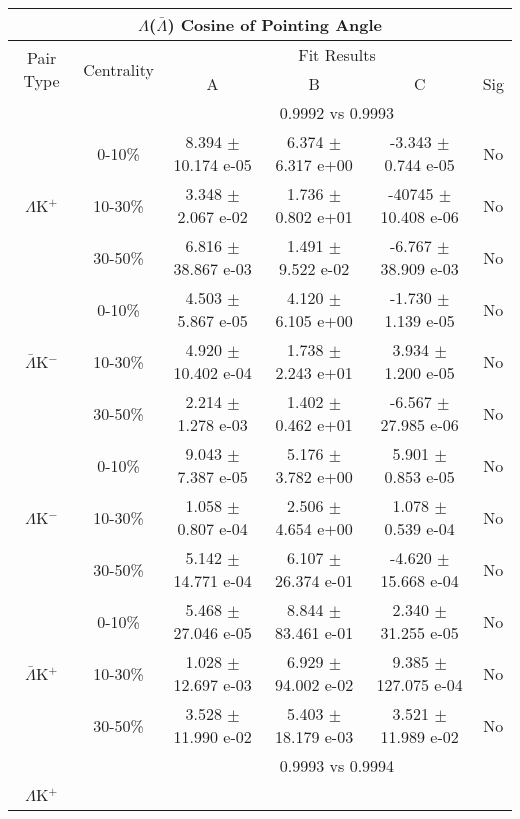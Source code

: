 \documentclass[../AnalysisNoteJBuxton.tex]{subfiles}
\begin{document}
\begin{table}
 \centering
 \begin{tabular}{|c|c|c|c|c|c|}
  \multicolumn{6}{c}{$\Lambda$($\bar{\Lambda}$) Cosine of Pointing Angle} \\
  \hline
  \multirow{2}{*}{Pair Type} & \multirow{2}{*}{Centrality} & \multicolumn{4}{c|}{Fit Results} \\
  \cline{3-6}
   & & A & B & C & Sig \\  
  \hline
  \multicolumn{2}{|c}{} & \multicolumn{4}{c|}{0.9992 vs 0.9993} \\  
  \hline  
  \multirow{3}{*}{$\Lambda$K$^{+}$}
   &  0-10\% & 8.394 $\pm$ 10.174 e-05 & 6.374 $\pm$ 6.317 e+00 & -3.343 $\pm$ 0.744 e-05 & No \\
   & 10-30\% & 3.348 $\pm$ 2.067 e-02 & 1.736 $\pm$ 0.802 e+01 & -40745 $\pm$ 10.408 e-06 & No \\
   & 30-50\% & 6.816 $\pm$ 38.867 e-03 & 1.491 $\pm$ 9.522 e-02 & -6.767 $\pm$ 38.909 e-03 & No \\
  \hline
  \multirow{3}{*}{$\bar{\Lambda}$K$^{-}$}  
   &  0-10\% & 4.503 $\pm$ 5.867 e-05 & 4.120 $\pm$ 6.105 e+00 & -1.730 $\pm$ 1.139 e-05 & No \\
   & 10-30\% & 4.920 $\pm$ 10.402 e-04 & 1.738 $\pm$ 2.243 e+01 & 3.934 $\pm$ 1.200 e-05 & No \\
   & 30-50\% & 2.214 $\pm$ 1.278 e-03 & 1.402 $\pm$ 0.462 e+01 & -6.567 $\pm$ 27.985 e-06 & No \\
  \hline \hline
  \multirow{3}{*}{$\Lambda$K$^{-}$}
   &  0-10\% & 9.043 $\pm$ 7.387 e-05 & 5.176 $\pm$ 3.782 e+00 & 5.901 $\pm$ 0.853 e-05 & No \\
   & 10-30\% & 1.058 $\pm$ 0.807 e-04 & 2.506 $\pm$ 4.654 e+00 & 1.078 $\pm$ 0.539 e-04 & No \\
   & 30-50\% & 5.142 $\pm$ 14.771 e-04 & 6.107 $\pm$ 26.374 e-01 & -4.620 $\pm$ 15.668 e-04 & No \\
  \hline
  \multirow{3}{*}{$\bar{\Lambda}$K$^{+}$}  
   &  0-10\% & 5.468 $\pm$ 27.046 e-05 & 8.844 $\pm$ 83.461 e-01 & 2.340 $\pm$ 31.255 e-05 & No \\
   & 10-30\% & 1.028 $\pm$ 12.697 e-03 & 6.929 $\pm$ 94.002 e-02 & 9.385 $\pm$ 127.075 e-04 & No \\
   & 30-50\% & 3.528 $\pm$ 11.990 e-02 & 5.403 $\pm$ 18.179 e-03 & 3.521 $\pm$ 11.989 e-02 & No \\  
  \hline
  \multicolumn{2}{|c}{} & \multicolumn{4}{c|}{0.9993 vs 0.9994} \\
  \hline  
  \multirow{3}{*}{$\Lambda$K$^{+}$}   

\end{tabular}
\end{table}
\end{document}
